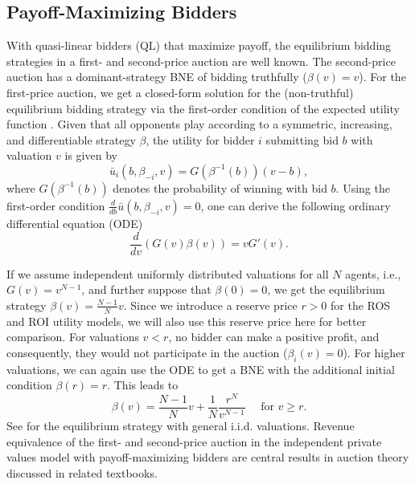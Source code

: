 \documentclass{article}
\begin{document}
\subsection{Payoff-Maximizing Bidders}

With quasi-linear bidders (QL) that maximize payoff, the equilibrium bidding strategies in a first- and second-price auction are well known. The second-price auction has a dominant-strategy BNE of bidding truthfully ($\beta(v)=v$). For the first-price auction, we get a closed-form solution for the (non-truthful) equilibrium bidding strategy via the first-order condition of the expected utility function \citep{krishna2009auction}. Given that all opponents play according to a symmetric, increasing, and differentiable strategy $\beta$, the utility for bidder $i$ submitting bid $b$ with valuation $v$ is given by
\begin{equation}
	\bar u_i (b,\beta_{-i}, v) = G(\beta^{-1}(b))(v-b),
\end{equation}
where $G(\beta^{-1}(b))$ denotes the probability of winning with bid $b$. 
Using the first-order condition $\frac{d}{db} \bar u(b,\beta_{-i}, v) = 0$, one can derive the following ordinary differential equation (ODE)
\begin{equation}
	\dfrac{d}{dv}(G(v)\beta(v)) = v G'(v).
\end{equation}

If we assume independent uniformly distributed valuations for all $N$ agents, i.e., $G(v) = v^{N-1}$, and further suppose that $\beta(0)=0$, we get the equilibrium strategy $\beta(v) = \frac{N-1}{N} v$.
Since we introduce a reserve price $r>0$ for the ROS and ROI utility models, we will also use this reserve price here for better comparison. 
For valuations $v<r$, no bidder can make a positive profit, and consequently, they would not participate in the auction ($\beta_i(v)=0$). For higher valuations, we can again use the ODE to get a BNE with the additional initial condition $\beta(r) = r$. This leads to
\begin{equation}\label{eq:eq_fpsb_ql}
	\beta(v) =  \dfrac{N-1}{N}v + \dfrac{1}{N} \dfrac{r^N}{v^{N-1}} \quad \text{ for } v \geq r.
\end{equation}
See \citet{krishna2009auction} for the equilibrium strategy with general i.i.d. valuations. Revenue equivalence of the first- and second-price auction in the independent private values model with payoff-maximizing bidders are central results in auction theory discussed in related textbooks. 
\end{document}
